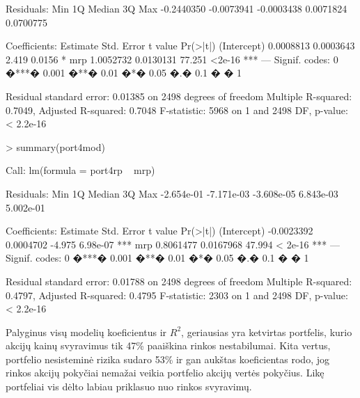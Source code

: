 \documentclass[a4paper]{article}
\begin{document}
\begin{Schunk}
\begin{Soutput}
Residuals:
       Min         1Q     Median         3Q        Max 
-0.2440350 -0.0073941 -0.0003438  0.0071824  0.0700775 

Coefficients:
             Estimate Std. Error t value Pr(>|t|)    
(Intercept) 0.0008813  0.0003643   2.419   0.0156 *  
mrp         1.0052732  0.0130131  77.251   <2e-16 ***
---
Signif. codes:  0 �***� 0.001 �**� 0.01 �*� 0.05 �.� 0.1 � � 1 

Residual standard error: 0.01385 on 2498 degrees of freedom
Multiple R-squared: 0.7049,	Adjusted R-squared: 0.7048 
F-statistic:  5968 on 1 and 2498 DF,  p-value: < 2.2e-16 
\end{Soutput}
\begin{Sinput}
> summary(port4mod)
\end{Sinput}
\begin{Soutput}
Call:
lm(formula = port4rp ~ mrp)

Residuals:
       Min         1Q     Median         3Q        Max 
-2.654e-01 -7.171e-03 -3.608e-05  6.843e-03  5.002e-01 

Coefficients:
              Estimate Std. Error t value Pr(>|t|)    
(Intercept) -0.0023392  0.0004702  -4.975 6.98e-07 ***
mrp          0.8061477  0.0167968  47.994  < 2e-16 ***
---
Signif. codes:  0 �***� 0.001 �**� 0.01 �*� 0.05 �.� 0.1 � � 1 

Residual standard error: 0.01788 on 2498 degrees of freedom
Multiple R-squared: 0.4797,	Adjusted R-squared: 0.4795 
F-statistic:  2303 on 1 and 2498 DF,  p-value: < 2.2e-16 
\end{Soutput}
\end{Schunk}
           
Palyginus visų modelių koeficientus ir $R^2$, geriausias yra ketvirtas portfelis, kurio akcijų kainų svyravimus tik 47\% paaiškina rinkos nestabilumai. Kita vertus, portfelio nesisteminė rizika sudaro 53\% ir gan aukštas koeficientas rodo, jog rinkos akcijų pokyčiai nemažai veikia portfelio akcijų vertės pokyčius. Likę portfeliai vis dėlto labiau priklasuo nuo rinkos
svyravimų.
\end{document}
